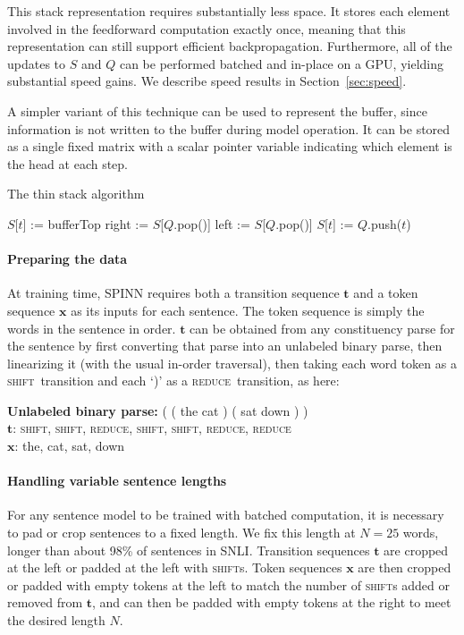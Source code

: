 \documentclass[11pt]{article}
\newcommand{\shift}{\textsc{shift}}
\newcommand{\reduce}{\textsc{reduce}}
\begin{document}
This stack representation requires substantially less space. It stores each element involved in the feedforward computation exactly once, meaning that this representation can still support efficient backpropagation. Furthermore, all of the updates to $S$ and $Q$ can be performed batched and in-place on a GPU, yielding substantial speed gains. We describe speed results in Section~\ref{sec:speed}.

A simpler variant of this technique can be used to represent the buffer, since information is not written to the buffer during model operation. It can be stored as a single fixed matrix with a scalar pointer variable indicating which element is the head at each step.

\begin{algorithm}[t]
\caption{The thin stack algorithm}
\label{alg:thin-stack}
\begin{algorithmic}[1]
    \If{op = \shift}
      \State $S$[$t$] := bufferTop
    \ElsIf{op = \reduce}
      \State right := $S$[$Q$.pop()]
      \State left := $S$[$Q$.pop()]
      \State $S$[$t$] := 
    \EndIf
    \State $Q$.push($t$)
  \EndFunction
\end{algorithmic}
\end{algorithm}

\paragraph{Preparing the data} At training time, SPINN requires both a transition sequence $\mathbf t$  and a token sequence $\mathbf x$ as its inputs for each sentence. The token sequence is simply the words in the sentence in order. $\mathbf t$ can be obtained from any constituency parse for the sentence by first converting that parse into an unlabeled binary parse, then linearizing it (with the usual in-order traversal), then taking each word token as a \shift\ transition and each `)' as a \reduce\ transition, as here:

\vspace{0.5em}
{\noindent\small
{\bf Unlabeled binary parse:} ( ( the cat ) ( sat down ) )\\
{$\mathbf t$}: \shift, \shift, \reduce, \shift, \shift, \reduce, \reduce\\
{$\mathbf x$}: the, cat, sat, down
}

\paragraph{Handling variable sentence lengths} For any sentence model to be trained with batched computation, it is necessary to pad or crop sentences to a fixed length. We fix this length at $N = 25$ words, longer than about 98\% of sentences in SNLI\@. Transition sequences $\mathbf t$ are cropped at the left or padded at the left with \shift s. Token sequences $\mathbf x$ are then cropped or padded with empty tokens at the left to match the number of \shift s added or removed from $\mathbf t$, and can then be padded with empty tokens at the right to meet the desired length $N$.
\end{document}
